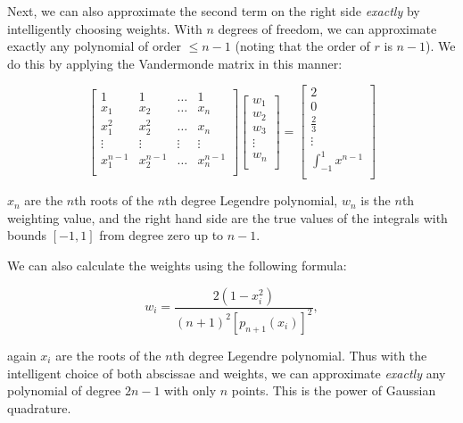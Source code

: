 Next, we can also approximate the second term on the right side \emph{exactly} by intelligently choosing weights.
%
With \(n\) degrees of freedom, we can approximate exactly any polynomial of order \(\leq n-1\) (noting that the order of \(r\) is \(n-1\)).
%
We do this by applying the Vandermonde matrix in this manner:

\begin{equation}
\begin{bmatrix}
1    & 1 &  \dots &1 \\
x_1      & x_2 &  \dots & x_n \\
x_1^2      & x_2^2 & \dots & x_n \\
\vdots & \vdots & \vdots & \vdots\\
x_1^{n-1}      & x_2^{n-1} & \dots & x_n^{n-1}\\
\end{bmatrix}
\begin{bmatrix}
w_1 \\
w_2 \\
w_3 \\
\vdots \\
w_n \\
\end{bmatrix}
=
\begin{bmatrix}
2  \\
0  \\
\frac{2}{3}  \\
\vdots \\
\int_{-1}^1 x^{n-1}  \\
\end{bmatrix}
\end{equation}

\where \(x_{n}\) are the \(n\)th roots of the \(n\)th degree Legendre polynomial, \(w_n\) is the \(n\)th weighting value, and the right hand side are the true values of the integrals with bounds \([-1, 1]\) from degree zero up to \(n-1\).

We can also calculate the weights using the following formula:

\begin{equation}
    w_i = \frac{2(1-x_i^2)}{(n+1)^2 [p_{n+1}(x_i)]^2 },
\end{equation}

\where again \(x_i\) are the roots of the \(n\)th degree Legendre polynomial.
%
Thus with the intelligent choice of both abscissae and weights, we can approximate \textit{exactly} any polynomial of degree \(2n-1\) with only \(n\) points. This is the power of Gaussian quadrature.

